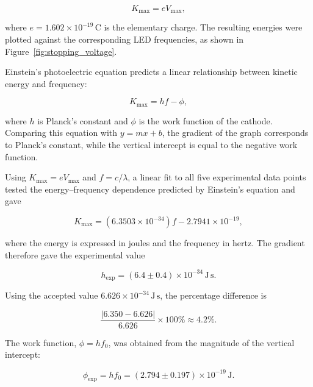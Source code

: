 \documentclass[12pt,a4paper]{article}
\begin{document}
\begin{equation}
    K_{\max}=eV_{\max},
\end{equation}

where \(e=1.602\times10^{-19}\,\mathrm{C}\) is the elementary charge. The resulting energies were plotted against the corresponding LED frequencies, as shown in Figure~\ref{fig:stopping_voltage}.

Einstein's photoelectric equation predicts a linear relationship between kinetic energy and frequency:

\begin{equation}
    K_{\max}=hf-\phi,
\end{equation}

where \(h\) is Planck's constant and \(\phi\) is the work function of the cathode. Comparing this equation with \(y=mx+b\), the gradient of the graph corresponds to Planck's constant, while the vertical intercept is equal to the negative work function.

Using \(K_{\max}=eV_{\max}\) and \(f=c/\lambda\), a linear fit to all five experimental data points tested the energy--frequency dependence predicted by Einstein's equation \cite{einstein1905,millikan1916} and gave

\begin{equation}
    K_{\max} =
    (6.3503\times10^{-34})f
    - 2.7941\times10^{-19},
\end{equation}

where the energy is expressed in joules and the frequency in hertz. The gradient therefore gave the experimental value

\begin{equation}
    h_{\mathrm{exp}} = (6.4\pm0.4)\times10^{-34}\,\mathrm{J\,s}.
\end{equation}

Using the accepted value \(6.626\times10^{-34}\,\mathrm{J\,s}\), the percentage difference is

\begin{equation}
    \frac{|6.350-6.626|}{6.626}\times100\%
    \approx 4.2\%.
\end{equation}

The work function, \(\phi=hf_0\), was obtained from the magnitude of the vertical intercept:

\begin{equation}
    \phi_{\mathrm{exp}}=hf_0 =
    (2.794\pm0.197)\times10^{-19}\,\mathrm{J}.
\end{equation}
\end{document}
